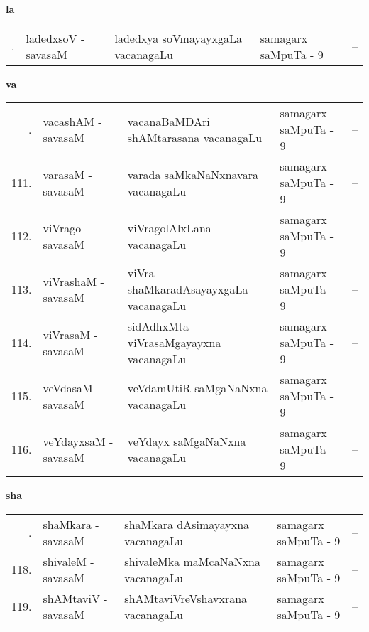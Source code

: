 \medskip

\centerline{\bf la}

{\renewcommand{\arraystretch}{1.3}
\begin{longtable}{rl>{\raggedright}p{5.5cm}lc}
\endfirsthead
\endhead
\endfoot
\endlastfoot
109. &  ladedxsoV - savasaM &  ladedxya soVmayayxgaLa vacanagaLu & samagarx saMpuTa - 9 & --\\
\end{longtable}}
\smallskip

\centerline{\bf va}

{\renewcommand{\arraystretch}{1.3}
\begin{longtable}{rl>{\raggedright}p{5.5cm}lc}
\endfirsthead
\endhead
\endfoot
\endlastfoot
110. &  vacashAM - savasaM & vacanaBaMDAri shAMtarasana vacanagaLu & samagarx saMpuTa - 9 & --\\
111. &  varasaM - savasaM &  varada saMkaNaNxnavara vacanagaLu & samagarx saMpuTa - 9 & --\\
112. &  viVrago - savasaM &  viVragolAlxLana vacanagaLu & samagarx saMpuTa - 9 & --\\
113. & viVrashaM - savasaM &  viVra shaMkaradAsayayxgaLa vacanagaLu & samagarx saMpuTa - 9 & --\\
114. & viVrasaM - savasaM & sidAdhxMta viVrasaMgayayxna vacanagaLu & samagarx saMpuTa - 9 & --\\
115. & veVdasaM - savasaM &  veVdamUtiR saMgaNaNxna vacanagaLu & samagarx saMpuTa - 9 & --\\
116. & veYdayxsaM - savasaM &  veYdayx saMgaNaNxna vacanagaLu & samagarx saMpuTa - 9 & --\\
\end{longtable}}
\smallskip

\centerline{\bf sha}

{\renewcommand{\arraystretch}{1.3}
\begin{longtable}{rl>{\raggedright}p{5.5cm}lc}
\endfirsthead
\endhead
\endfoot
\endlastfoot
117. & shaMkara - savasaM &  shaMkara dAsimayayxna vacanagaLu & samagarx saMpuTa - 9 & --\\
118. & shivaleM - savasaM &  shivaleMka maMcaNaNxna vacanagaLu & samagarx saMpuTa - 9 & --\\
119. & shAMtaviV - savasaM & shAMtaviVreVshavxrana vacanagaLu & samagarx saMpuTa - 9 & --\\
\end{longtable}}
\smallskip

